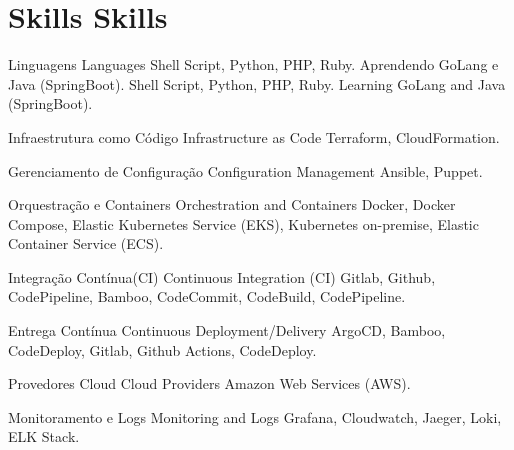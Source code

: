 \section{
    {Skills}
    {Skills}
  }
  \vspace{3pt}
  \resumeSubHeadingListStart

    \resumeSubheading
      {%
          {Linguagens}
          {Languages}
      }{}
      {%
          {Shell Script, Python, PHP, Ruby. Aprendendo GoLang e Java (SpringBoot).}
          {Shell Script, Python, PHP, Ruby. Learning GoLang and Java (SpringBoot).}
      }{}

    \resumeSubheading
      {%
          {Infraestrutura como Código}
          {Infrastructure as Code}
      }{}
      {%
        {Terraform, CloudFormation.}
      }{}

    \resumeSubheading
      {%
          {Gerenciamento de Configuração}
          {Configuration Management}
      }{}
      {%
        {Ansible, Puppet.}
      }{}

    \resumeSubheading
      {%
          {Orquestração e Containers}
          {Orchestration and Containers}
      }{}
      {%
        {Docker, Docker Compose, Elastic Kubernetes Service (EKS), Kubernetes on-premise, Elastic Container Service (ECS).}
      }{}

    \resumeSubheading
      {%
          {Integração Contínua(CI)}
          {Continuous Integration (CI)}
      }{}
      {%
        {Gitlab, Github, CodePipeline, Bamboo, CodeCommit, CodeBuild, CodePipeline.}
      }{}

    \resumeSubheading
      {%
          {Entrega Contínua}
          {Continuous Deployment/Delivery}
      }{}
      {%
        {ArgoCD, Bamboo, CodeDeploy, Gitlab, Github Actions, CodeDeploy.}
      }{}

    \resumeSubheading
      {%
          {Provedores Cloud}
          {Cloud Providers}
      }{}
      {%
        {Amazon Web Services (AWS).}
      }{}

    \resumeSubheading
      {%
          {Monitoramento e Logs}
          {Monitoring and Logs}
      }{}
      {%
        {Grafana, Cloudwatch, Jaeger, Loki, ELK Stack.}
      }{}


  \resumeSubHeadingListEnd
